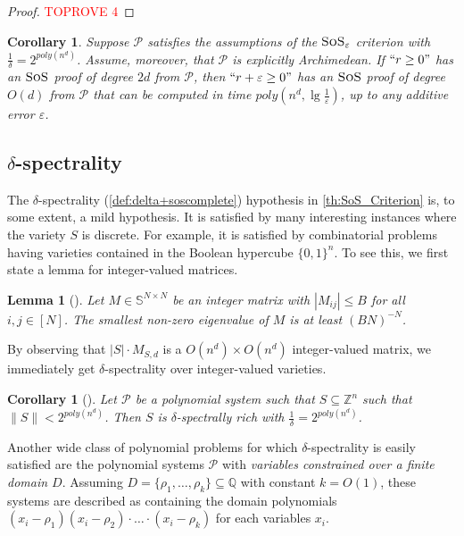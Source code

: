 \documentclass[11pt]{article}
\newcommand{\sos}{\text{\sc{SoS}}}
\newcommand{\1}{\textbf{1}}
\newtheorem{lemma}[theorem]{Lemma}
\newtheorem{corollary}[theorem]{Corollary}
\begin{document}
\begin{proof}\textcolor{red}{TOPROVE 4}\end{proof}

\begin{corollary}
    Suppose $\mathcal{P}$ satisfies the assumptions of the $\sos_\varepsilon$ criterion with $\frac{1}{\delta}=2^{poly(n^d)}$. Assume, moreover, that $\mathcal{P}$ is explicitly Archimedean. If $``r\geq 0"$ has an $\sos$ proof of degree $2d$ from $\mathcal{P}$, then $``r + \varepsilon \geq 0"$ has an $\sos$ proof of degree $O(d)$ from $\mathcal{P}$ that can be computed in time $poly(n^d, \lg \frac{1}{\varepsilon})$, up to any additive error $\varepsilon$.
\end{corollary}



\subsection[Delta-spectrality]{$\delta$-spectrality}\label{sect:delta_spectrality}


The $\delta$-spectrality (\cref{def:delta+soscomplete}) hypothesis in \cref{th:SoS_Criterion} is, to some extent, a mild hypothesis. It is satisfied by many interesting instances where the variety $S$ is discrete. For example, it is satisfied by combinatorial problems having varieties contained in the Boolean hypercube $\{0,1\}^n$. To see this, we first state a lemma for integer-valued matrices.

\begin{lemma}[\cite{raghavendra_weitz2017}]\label{th:spectrality_integer_matrix}
    Let $M \in \mathbb{S}^{N \times N}$ be an integer matrix with $|M_{ij}| \leq B$ for all $i,j \in [N]$. The smallest non-zero eigenvalue of $M$ is at least $(BN)^{-N}$. 
\end{lemma}

By observing that $|S| \cdot M_{S,d}$ is a $O(n^d) \times O(n^d)$ integer-valued matrix, we immediately get $\delta$-spectrality over integer-valued varieties.

\begin{corollary}[\cite{raghavendra_weitz2017}]
    Let $\mathcal{P}$ be a polynomial system such that $S \subseteq \mathbb{Z}^n$ such that $\| S \| < 2^{poly(n^d)}$. Then $S$ is $\delta$-spectrally rich with $\frac{1}{\delta} = 2^{poly(n^d)}$.
\end{corollary}

Another wide class of polynomial problems for which $\delta$-spectrality is easily satisfied are the polynomial systems $\mathcal{P}$ with \textit{variables constrained over a finite domain $D$}. Assuming $D =\{\rho_1, \dots, \rho_k\} \subseteq \mathbb{Q}$ with constant $k=O(1)$, these systems are described as containing the domain polynomials $(x_i - \rho_1)(x_i - \rho_2) \cdot \dots \cdot (x_i - \rho_k)$ for each variables $x_i$.
\end{document}
